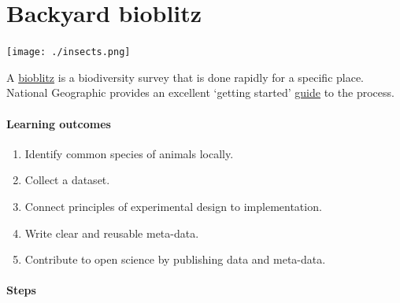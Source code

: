 \documentclass[
]{book}
\providecommand{\tightlist}{%
  \setlength{\itemsep}{0pt}\setlength{\parskip}{0pt}}
\begin{document}
\hypertarget{bioblitz}{%
\chapter{Backyard bioblitz}\label{bioblitz}}

\texttt{[image: ./insects.png]}

A \href{https://en.wikipedia.org/wiki/BioBlitz}{bioblitz} is a biodiversity survey that is done rapidly for a specific place. National Geographic provides an excellent `getting started' \href{https://media.nationalgeographic.org/assets/file/NationalGeographicBioBlitzGuide.pdf}{guide} to the process.

\hypertarget{learning-outcomes-1}{%
\subsubsection*{Learning outcomes}\label{learning-outcomes-1}}

\begin{enumerate}
\def\labelenumi{\arabic{enumi}.}
\tightlist
\item
  Identify common species of animals locally.\\
\item
  Collect a dataset.\\
\item
  Connect principles of experimental design to implementation.\\
\item
  Write clear and reusable meta-data.\\
\item
  Contribute to open science by publishing data and meta-data.
\end{enumerate}

\hypertarget{steps-1}{%
\subsubsection*{Steps}\label{steps-1}}
\end{document}
